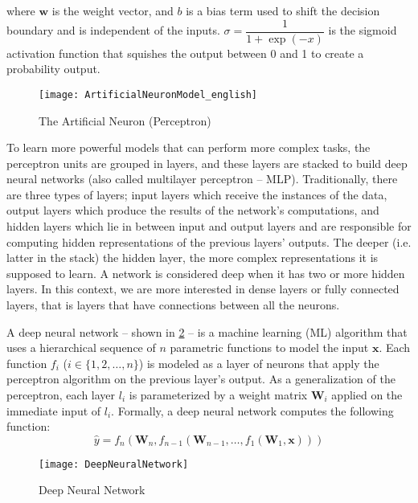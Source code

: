 where $\mathbf{w}$ is the weight vector, and $b$ is a bias term used to shift the decision boundary and is independent of the inputs. $\sigma = \dfrac{1}{1 + \exp(-x)}$ is the sigmoid activation function that squishes the output between 0 and 1 to create a probability output.

\begin{figure}[ht]
\centering
\texttt{[image: ArtificialNeuronModel\_english]}
\caption{The Artificial Neuron (Perceptron) \protect\footnotemark}
\label{fig:perceptron}
\end{figure}

To learn more powerful models that can perform more complex tasks, the perceptron units are grouped in layers, and these layers are stacked to build deep neural networks (also called multilayer perceptron -- MLP). Traditionally, there are three types of layers; input layers which receive the instances of the data, output layers which produce the results of the network's computations, and hidden layers which lie in between input and output layers and are responsible for computing hidden representations of the previous layers' outputs. The deeper (i.e. latter in the stack) the hidden layer, the more complex representations it is supposed to learn. A network is considered deep when it has two or more hidden layers. In this context, we are more interested in dense layers or fully connected layers, that is layers that have connections between all the neurons.

A deep neural network -- shown in \cref{fig:deep_network} -- is a machine learning (ML) algorithm that uses a hierarchical sequence of $n$ parametric functions to model the input $\mathbf{x}$. Each function $f_i$ ($i \in \{1, 2, \ldots, n\}$)  is modeled as a layer of neurons that apply the perceptron algorithm on the previous layer's output. As a generalization of the perceptron, each layer $l_i$ is parameterized by a weight matrix $\mathbf{W}_i$ applied on the immediate input of $l_i$. Formally, a deep neural network computes the following function:
\[ \hat y = f_n( \mathbf{W}_n, f_{n-1}( \mathbf{W}_{n-1}, \ldots, f_1 (\mathbf{W}_1, \mathbf{x}) ) ) \]

\begin{figure}[ht]
\centering
\texttt{[image: DeepNeuralNetwork]}
\caption{Deep Neural Network \protect\footnotemark}
\label{fig:deep_network}
\end{figure}

